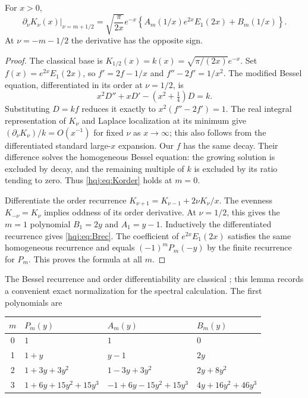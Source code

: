 \begin{lemma}
\label{hqj:lem:Bessel}
For $x>0$,
\begin{equation}\label{hqj:eq:Korder}
\left.\partial_\nu K_\nu(x)\right|_{\nu=m+1/2}
=\sqrt{\frac\pi{2x}}e^{-x}
\left\{A_m(1/x)e^{2x}E_1(2x)+B_m(1/x)\right\}.
\end{equation}
At $\nu=-m-1/2$ the derivative has the opposite sign.
\end{lemma}
\begin{proof}
The classical base is $K_{1/2}(x)=k(x)=\sqrt{\pi/(2x)}e^{-x}$.
Set $f(x)=e^{2x}E_1(2x)$, so
$f'=2f-1/x$ and $f''-2f'=1/x^2$.
The modified Bessel equation, differentiated in its order at $\nu=1/2$,
is
\[
x^2D''+xD'-(x^2+\tfrac14)D=k.
\]
Substituting $D=kf$ reduces it exactly to
$x^2(f''-2f')=1$. The real integral representation of $K_\nu$ and
Laplace localization at its minimum give
$(\partial_\nu K_\nu)/k=O(x^{-1})$ for fixed $\nu$ as $x\to\infty$;
this also follows from the differentiated standard large-$x$ expansion.
Our $f$ has the same decay. Their difference solves the homogeneous
Bessel equation: the growing solution is excluded by decay, and the
remaining multiple of $k$ is excluded by its ratio tending to zero.
Thus \eqref{hqj:eq:Korder} holds at $m=0$.

Differentiate the order recurrence
$K_{\nu+1}=K_{\nu-1}+2\nu K_\nu/x$.
The evenness $K_{-\nu}=K_\nu$ implies oddness of its order derivative.
At $\nu=1/2$, this gives the $m=1$ polynomial $B_1=2y$ and
$A_1=y-1$. Inductively the differentiated recurrence gives
\eqref{hqj:eq:Brec}. The coefficient of $e^{2x}E_1(2x)$ satisfies the
same homogeneous recurrence and equals $(-1)^mP_m(-y)$ by the finite
recurrence for $P_m$. This proves the formula at all $m$.
\end{proof}
The Bessel recurrence and order differentiability are classical
\cite{besselrec,order}; this lemma records a convenient exact
normalization for the spectral calculation. The first polynomials are
\begin{center}
\begin{tabular}{c l l l}
\toprule
$m$ & $P_m(y)$ & $A_m(y)$ & $B_m(y)$\\
\midrule
0 & $1$ & $1$ & $0$\\
1 & $1+y$ & $y-1$ & $2y$\\
2 & $1+3y+3y^2$ & $1-3y+3y^2$ & $2y+8y^2$\\
3 & $1+6y+15y^2+15y^3$ & $-1+6y-15y^2+15y^3$
& $4y+16y^2+46y^3$\\
\bottomrule
\end{tabular}
\end{center}

